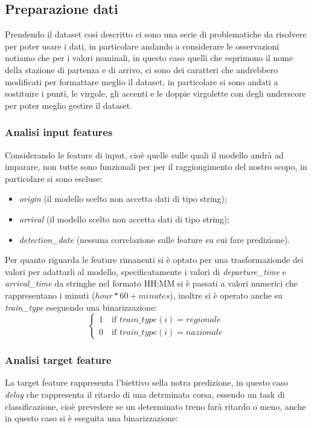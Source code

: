 \documentclass[italian,12pt,a4paper]{article}
\begin{document}
	\subsection{Preparazione dati}
		Prendendo il dataset così descritto ci sono una serie di problematiche da risolvere per poter usare i dati, in particolare andando a considerare le osservazioni notiamo che per i valori nominali, in questo caso quelli che esprimono il nome della stazione di partenza e di arrivo, ci sono dei caratteri che andrebbero modificati per formattare meglio il dataset, in particolare si sono andati a sostituire i punti, le virgole, gli accenti e le doppie virgolette con degli underscore per poter meglio gestire il dataset.
		
		\subsubsection{Analisi input features}
			Considerando le feature di input, cioè quelle sulle quali il modello andrà ad imparare, non tutte sono funzionali per per il raggiongimento del nostro scopo, in particolare si sono escluse:
			
			\begin{itemize}
				\item \textit{origin} (il modello scelto non accetta dati di tipo string);
				\item \textit{arrival} (il modello scelto non accetta dati di tipo string);
				\item \textit{detection\_date} (nessuna correlazione sulle feature su cui fare predizione).
			\end{itemize}
			Per quanto riguarda le feature rimanenti si è optato per una trasformazionde dei valori per adattarli al modello, specificatamente i valori di \textit{departure\_time} e \textit{arrival\_time} da stringhe nel formato HH:MM si è passati a valori numerici che rappresentano i minuti ($hour*60+minutes$), inoltre si è operato anche su \textit{train\_type} eseguendo una binarizzazione:
			\begin{equation*}
				\begin{cases}
					1 \quad \text{if } train\_type(i) = regionale \\
					0 \quad \text{if } train\_type(i) = nazionale
				\end{cases}
			\end{equation*}
			
		\subsubsection{Analisi target feature}
			La target feature rappresenta l'biettivo sella notra predizione, in questo caso \textit{delay} che rappresenta il ritardo di una detrminata corsa, essendo un task di classificazione, cioè prevedere se un determinato treno farà ritardo o meno, anche in questo caso si è eseguita una binarizzazione:
			
\end{document}
